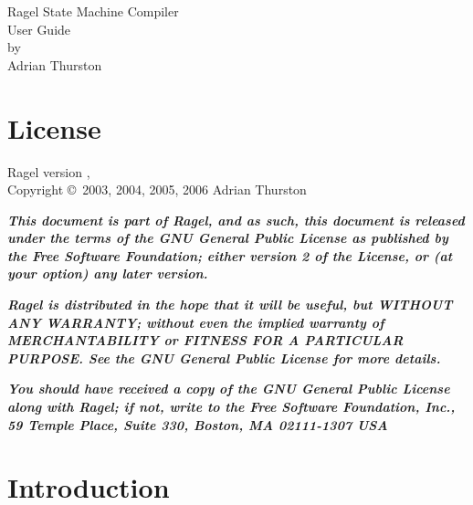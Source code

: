 \documentclass[letterpaper,11pt,oneside]{book}
\begin{document}
%
%
\thispagestyle{empty}
\begin{center}
\vspace*{3in}
{\huge Ragel State Machine Compiler}\\
\vspace*{12pt}
{\Large User Guide}\\
\vspace{1in}
by\\
\vspace{12pt}
{\large Adrian Thurston}\\
\end{center}
\clearpage


%
%
\chapter*{License}
Ragel version \version, \pubdate\\
Copyright \copyright\ 2003, 2004, 2005, 2006 Adrian Thurston
\vspace{6mm}

{\bf\it\noindent This document is part of Ragel, and as such, this document is
released under the terms of the GNU General Public License as published by the
Free Software Foundation; either version 2 of the License, or (at your option)
any later version.}

\vspace{5pt}

{\bf\it\noindent Ragel is distributed in the hope that it will be useful, but
WITHOUT ANY WARRANTY; without even the implied warranty of MERCHANTABILITY or
FITNESS FOR A PARTICULAR PURPOSE.  See the GNU General Public License for more
details.}

\vspace{5pt}

{\bf\it\noindent You should have received a copy of the GNU General Public
License along with Ragel; if not, write to the Free Software Foundation, Inc.,
59 Temple Place, Suite 330, Boston, MA  02111-1307  USA}

%
%
\clearpage
\tableofcontents
\clearpage

%
%


\chapter{Introduction}
\end{document}
